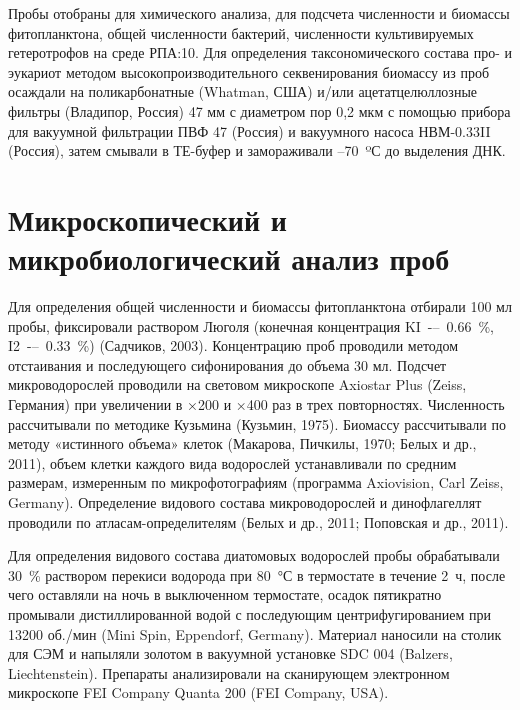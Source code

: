 \documentclass[a4paper,12pt,openany,final]{extreport}
\begin{document}
Пробы отобраны для химического анализа, для подсчета численности и биомассы фитопланктона, общей численности бактерий, численности культивируемых гетеротрофов на среде РПА:10. Для определения таксономического состава про- и эукариот методом высокопроизводительного секвенирования биомассу из проб осаждали на поликарбонатные (Whatman, США) и/или ацетатцелюллозные фильтры (Владипор, Россия) 47 мм с диаметром пор 0,2 мкм с помощью прибора для вакуумной фильтрации ПВФ 47 (Россия) и вакуумного насоса НВМ-0.33II (Россия), затем смывали в ТЕ-буфер и замораживали –70~ºС до выделения ДНК.

\section{Микроскопический и микробиологический анализ проб}

Для определения общей численности и биомассы фитопланктона отбирали 100 мл пробы, фиксировали раствором Люголя (конечная концентрация KI~-–~0.66~\%, I2~-–~0.33~\%) (Садчиков, 2003). Концентрацию проб проводили методом отстаивания и последующего сифонирования до объема 30 мл. Подсчет микроводорослей проводили на световом микроскопе Axiostar Plus (Zeiss, Германия) при увеличении в ×200 и ×400 раз в трех повторностях. Численность рассчитывали по методике Кузьмина (Кузьмин, 1975). Биомассу рассчитывали по методу «истинного объема» клеток (Макарова, Пичкилы, 1970; Белых и др., 2011), объем клетки каждого вида водорослей устанавливали по средним размерам, измеренным по микрофотографиям (программа Axiovision, Carl Zeiss, Germany). Определение видового состава микроводорослей и динофлагеллят проводили по атласам-определителям (Белых и др., 2011; Поповская и др., 2011).

Для определения видового состава диатомовых водорослей пробы обрабатывали 30~\% раствором перекиси водорода при 80~°С в термостате в течение 2~ч, после чего оставляли на ночь в выключенном термостате, осадок пятикратно промывали дистиллированной водой с последующим центрифугированием при 13200 об./мин (Mini Spin, Eppendorf, Germany). Материал наносили на столик для СЭМ и напыляли золотом в вакуумной установке SDC 004 (Balzers, Liechtenstein). Препараты анализировали на сканирующем электронном микроскопе FEI Company Quanta 200 (FEI Company, USA).
\end{document}
